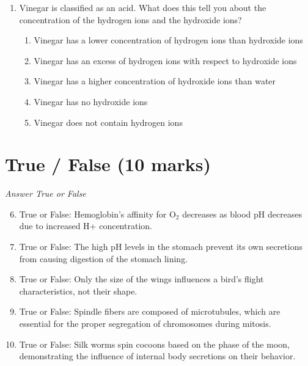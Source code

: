 \documentclass[12pt]{article}
\begin{document}
\begin{enumerate}[label=\arabic*.]
\begin{enumerate}[label=(\alph*)]
    \item cross section of muscle tissue
    \item longitudinal section of a shoot tip
    \item longitudinal section of a leaf vein
    \item cross section of a fruit
    \item cross section of a leaf
\end{enumerate}
\item Vinegar is classified as an acid. What does this tell you about the concentration of the hydrogen ions and the hydroxide ions?
\begin{enumerate}[label=(\alph*)]
    \item Vinegar has a lower concentration of hydrogen ions than hydroxide ions
    \item Vinegar has an excess of hydrogen ions with respect to hydroxide ions
    \item Vinegar has a higher concentration of hydroxide ions than water
    \item Vinegar has no hydroxide ions
    \item Vinegar does not contain hydrogen ions
\end{enumerate}
\end{enumerate}

\section*{True / False (10 marks)}
\textit{Answer True or False}
\begin{enumerate}[label=\arabic*.]
\setcounter{enumi}{5}
\item True or False: Hemoglobin's affinity for O$_{2}$ decreases as blood pH decreases due to increased H+ concentration.
\item True or False: The high pH levels in the stomach prevent its own secretions from causing digestion of the stomach lining.
\item True or False: Only the size of the wings influences a bird's flight characteristics, not their shape.
\item True or False: Spindle fibers are composed of microtubules, which are essential for the proper segregation of chromosomes during mitosis.
\item True or False: Silk worms spin cocoons based on the phase of the moon, demonstrating the influence of internal body secretions on their behavior.
\end{enumerate}
\end{document}
